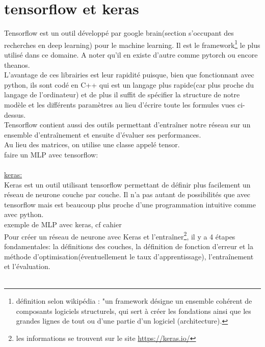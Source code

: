 \documentclass[openany,14pt,fleqn]{book} %
\begin{document}
\section{tensorflow et keras}
Tensorflow est un outil développé par google brain(section s'occupant des recherches en deep learning) pour le machine learning. Il est le framework\footnote{définition selon wikipédia : "un framework désigne un ensemble cohérent de composants logiciels structurels, qui sert à créer les fondations ainsi que les grandes lignes de tout ou d’une partie d'un logiciel (architecture).} le plus utilisé dans ce domaine. A noter qu'il en existe d'autre comme pytorch ou encore theanos.\\
L'avantage de ces librairies est leur rapidité puisque, bien que fonctionnant avec python, ils sont codé en C++ qui est un langage plus rapide(car plus proche du langage de l'ordinateur) et de plus il suffit de spécifier la structure de notre modèle et les différents paramètres au lieu d'écrire toute les formules vues ci-dessus.\\ Tensorflow contient aussi des outils permettant d'entraîner notre réseau sur un ensemble d'entraînement et ensuite d'évaluer ses performances.\\ Au lieu des matrices, on utilise une classe appelé tensor.\\
faire un MLP avec tensorflow:\\ \\
\underline{keras:}\\
Keras est un outil utilisant tensorflow permettant de définir plus facilement un réseau de neurone couche par couche. Il n'a pas autant de possibilités que avec tensorflow mais est beaucoup plus proche d'une programmation intuitive comme avec python.\\ 
exemple de MLP avec keras, cf cahier\\
Pour créer un réseau de neurone avec Keras et l'entraîner\footnote{les informations se trouvent sur le site \url{https://keras.io/}}, il y a 4 étapes fondamentales: la définitions des couches, la définition de fonction d'erreur et la méthode d'optimisation(éventuellement le taux d'apprentissage), l'entraînement et l'évaluation.\\ \\
\end{document}
